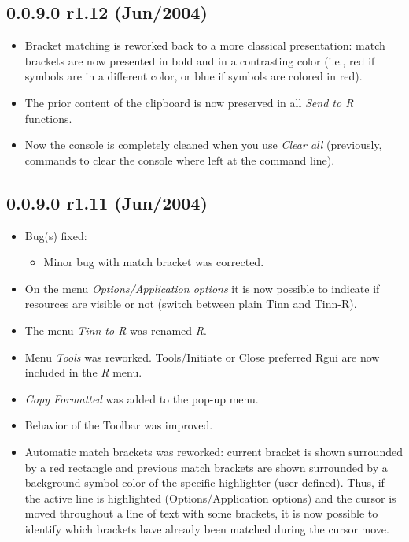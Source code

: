 \subsection*{0.0.9.0 r1.12 (Jun/2004)}
\begin{itemize}
  \item Bracket matching is reworked back to a more classical presentation: match brackets are now
    presented in bold and in a contrasting color (i.e., red if symbols are in a different color,
    or blue if symbols are colored in red).
  \item The prior content of the clipboard is now preserved in all \textit{Send to R} functions.
  \item Now the \RR{} console is completely cleaned when you use \textit{Clear all} (previously,
    commands to clear the console where left at the command line).
\end{itemize}


\subsection*{0.0.9.0 r1.11 (Jun/2004)}
\begin{itemize}
  \item Bug(s) fixed:
    \begin{itemize}
      \item Minor bug with match bracket was corrected.
    \end{itemize}
  \item On the menu \textit{Options/Application options} it is now possible to indicate if \RR{} resources
    are visible or not (switch between plain Tinn and Tinn-R).
  \item The menu \textit{Tinn to R} was renamed \textit{R}.
  \item Menu \textit{Tools} was reworked.  Tools/Initiate or Close preferred Rgui are now included in the \textit{R} menu.
  \item \textit{Copy Formatted} was added to the pop-up menu.
  \item Behavior of the \RR{} Toolbar was improved.
  \item Automatic match brackets was reworked: current bracket is shown surrounded by a red rectangle and previous match     brackets are shown surrounded by a background symbol color of the specific highlighter (user defined). Thus, if the active line is highlighted (Options/Application options) and the cursor is moved throughout a line of text with some brackets, it is now possible to identify which brackets have already been matched during the cursor move.
\end{itemize}


